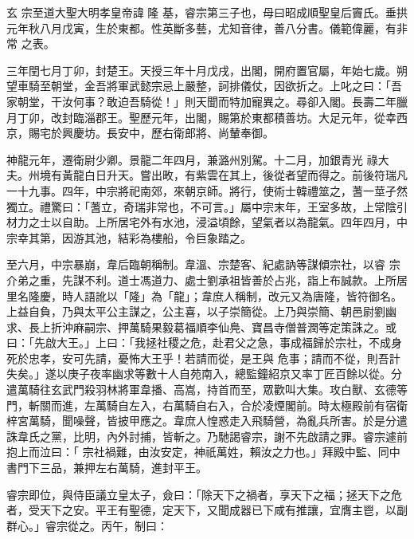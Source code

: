 
\begin{pinyinscope}

 玄
 宗至道大聖大明孝皇帝諱
 隆
 基，睿宗第三子也，母曰昭成順聖皇后竇氏。垂拱元年秋八月戊寅，生於東都。性英斷多藝，尤知音律，善八分書。儀範偉麗，有非常
 之表。



 三年閏七月丁卯，封楚王。天授三年十月戊戌，出閣，開府置官屬，年始七歲。朔望車騎至朝堂，金吾將軍武懿宗忌上嚴整，訶排儀仗，因欲折之。上叱之曰：「吾家朝堂，干汝何事？敢迫吾騎從！」則天聞而特加寵異之。尋卻入閣。長壽二年臘月丁卯，改封臨淄郡王。聖歷元年，出閣，賜第於東都積善坊。大足元年，從幸西京，賜宅於興慶坊。長安中，歷右衛郎將、尚輦奉御。



 神龍元年，遷衛尉少卿。景龍二年四月，兼潞州別駕。十二月，加銀青光
 祿大夫。州境有黃龍白日升天。嘗出畋，有紫雲在其上，後從者望而得之。前後符瑞凡一十九事。四年，中宗將祀南郊，來朝京師。將行，使術士韓禮筮之，蓍一莖孑然獨立。禮驚曰：「蓍立，奇瑞非常也，不可言。」屬中宗末年，王室多故，上常陰引材力之士以自助。上所居宅外有水池，浸溢頃餘，望氣者以為龍氣。四年四月，中宗幸其第，因游其池，結彩為樓船，令巨象踏之。



 至六月，中宗暴崩，韋后臨朝稱制。韋溫、宗楚客、紀處訥等謀傾宗社，以睿
 宗介弟之重，先謀不利。道士馮道力、處士劉承祖皆善於占兆，詣上布誠款。上所居里名隆慶，時人語訛以「隆」為「龍」；韋庶人稱制，改元又為唐隆，皆符御名。上益自負，乃與太平公主謀之，公主喜，以子崇簡從。上乃與崇簡、朝邑尉劉幽求、長上折沖麻嗣宗、押萬騎果毅葛福順李仙鳧、寶昌寺僧普潤等定策誅之。或曰：「先啟大王。」上曰：「我拯社稷之危，赴君父之急，事成福歸於宗社，不成身死於忠孝，安可先請，憂怖大王乎！若請而從，是王與
 危事；請而不從，則吾計失矣。」遂以庚子夜率幽求等數十人自苑南入，總監鐘紹京又率丁匠百餘以從。分遣萬騎往玄武門殺羽林將軍韋播、高嵩，持首而至，眾歡叫大集。攻白獸、玄德等門，斬關而進，左萬騎自左入，右萬騎自右入，合於凌煙閣前。時太極殿前有宿衛梓宮萬騎，聞噪聲，皆披甲應之。韋庶人惶惑走入飛騎營，為亂兵所害。於是分遣誅韋氏之黨，比明，內外討捕，皆斬之。乃馳謁睿宗，謝不先啟請之罪。睿宗遽前抱上而泣曰：「
 宗社禍難，由汝安定，神祇萬姓，賴汝之力也。」拜殿中監、同中書門下三品，兼押左右萬騎，進封平王。



 睿宗即位，與侍臣議立皇太子，僉曰：「除天下之禍者，享天下之福；拯天下之危者，受天下之安。平王有聖德，定天下，又聞成器已下咸有推讓，宜膺主鬯，以副群心。」睿宗從之。丙午，制曰：




\end{pinyinscope}

